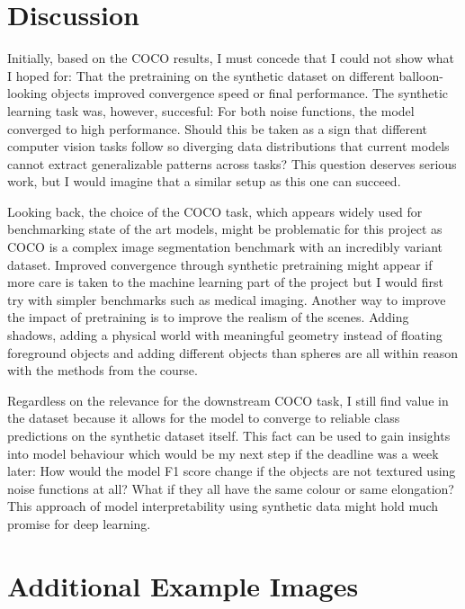 \documentclass[12pt,fleqn]{article}
\begin{document}
\section{Discussion}%
\label{sec:disc}
Initially, based on the COCO results, I must concede that I could not show what I hoped for:
That the pretraining on the synthetic dataset on different balloon-looking objects improved convergence speed or final performance.
The synthetic learning task was, however, succesful:
For both noise functions, the model converged to high performance.
Should this be taken as a sign that different computer vision tasks follow so diverging data distributions that current models cannot extract generalizable patterns across tasks?
This question deserves serious work, but I would imagine that a similar setup as this one can succeed.

Looking back, the choice of the COCO task, which appears widely used for benchmarking state of the art models, might be problematic for this project as COCO is a complex image segmentation benchmark with an incredibly variant dataset.
Improved convergence through synthetic pretraining might appear if more care is taken to the machine learning part of the project but I would first try with simpler benchmarks such as medical imaging.
Another way to improve the impact of pretraining is to improve the realism of the scenes.
Adding shadows, adding a physical world with meaningful geometry instead of floating foreground objects and adding different objects than spheres are all within reason with the methods from the course.

Regardless on the relevance for the downstream COCO task, I still find value in the dataset because it allows for the model to converge to reliable class predictions on the synthetic dataset itself.
This fact can be used to gain insights into model behaviour which would be my next step if the deadline was a week later:
How would the model F1 score change if the objects are not textured using noise functions at all?
What if they all have the same colour or same elongation?
This approach of model interpretability using synthetic data might hold much promise for deep learning.

\clearpage

\printbibliography[heading=bibintoc]

\clearpage

\appendix
\section{Additional Example Images}
\end{document}
